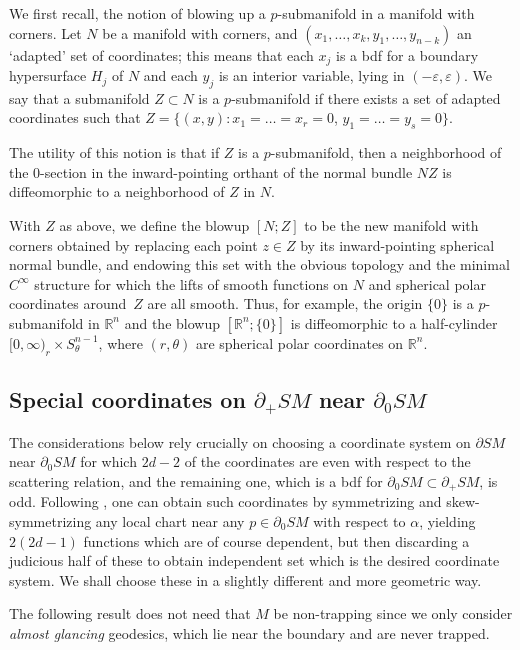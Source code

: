 \documentclass[JEP,XML,SOM,Unicode,NoFloatCountersInSection, NoEqCountersInSection,published]{cedram}
\let\epsilon\varepsilon
\theoremstyle{plain}
\theoremstyle{definition}
\theoremstyle{remark}
\newcommand{\del}{\partial}
\begin{document}
We first recall, the notion of blowing up a $p$\nobreakdash-sub\-manifold in a manifold with corners. Let $N$ be a manifold with corners, and $(x_1, \ldots, x_k, y_1, \ldots, y_{n-k})$ an `adapted' set of coordinates; this means that each $x_j$ is a bdf for a boundary hypersurface $H_j$ of $N$ and each $y_j$ is an interior variable, lying in $(-\epsilon, \epsilon)$. We say that a submanifold $Z \subset N$ is a $p$-submanifold if there exists a set of adapted coordinates such that $Z = \{(x,y): x_1 = \ldots = x_r = 0$, $y_1 = \ldots = y_s = 0\}$.

The utility of this notion is that if $Z$ is a $p$-submanifold, then a neighborhood of the $0$-section in the inward-pointing orthant of the normal bundle $NZ$ is diffeomorphic to a neighborhood of $Z$ in $N$.

With $Z$ as above, we define the blowup $[N;Z]$ to be the new manifold with corners obtained by replacing each point $z \in Z$ by its inward-pointing spherical normal bundle, and endowing this set with the obvious topology and the minimal $C^\infty$ structure for which the lifts of smooth functions on $N$ and spherical polar coordinates around~$Z$ are all smooth. Thus, for example, the origin $\{0\}$ is a $p$-submanifold in $\mathbb R^n$ and the blowup $[\mathbb R^n; \{0\}]$ is diffeomorphic to a half-cylinder $[0,\infty)_r \times S^{n-1}_\theta$, where $(r,\theta)$ are spherical polar coordinates on $\mathbb R^n$.

\subsection{Special coordinates on $\partial_+ SM$ near $\partial_0 SM$} \label{sec:glancingCoords}

The considerations below rely crucially on choosing a coordinate system on $\partial SM$ near $\partial_0 SM$ for which $2d-2$
of the coordinates are even with respect to the scattering relation, and the remaining one, which is a bdf for $\del_0 SM \subset \del_+ SM$, is odd.
Following \cite[Th.\,C.4.5]{Hoermander2007}, one can obtain such coordinates by symmetrizing and skew-symmetrizing
any local chart near any $p\in \partial_0 SM$ with respect to $\alpha$, yielding $2(2d-1)$ functions which are of course dependent,
but then discarding a judicious half of these to obtain independent set which is the desired coordinate system. We shall
choose these in a slightly different and more geometric way.

The following result does not need that $M$ be non-trapping since we only consider {\it almost glancing} geodesics, which
lie near the boundary and are never trapped.
\end{document}
